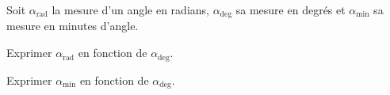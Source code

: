 	Soit $\alpha_{\text{rad}}$ la mesure d'un angle en radians, $\alpha_{\text{deg}}$ sa mesure en degrés et $\alpha_{\text{min}}$ sa mesure en minutes d'angle.
	
	\debutEntrainement
	
	
	
	\begin{enonce}
		Exprimer $\alpha_{\text{rad}}$ en fonction de $\alpha_{\text{deg}}$.
	\end{enonce}
	
	
	
	\begin{enonce}
		Exprimer $\alpha_{\text{min}}$ en fonction de $\alpha_{\text{deg}}$.
	\end{enonce}
	
	
	\finEntrainement
	
	
	
	
	
	
	
	\hauteurLargeurCadreReponse		{8mm}{2cm}
	\initialisationEntrainement
	
	
	\debutEntrainement
	
